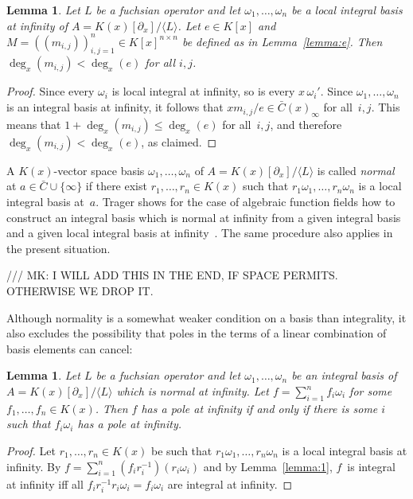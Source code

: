 \documentclass{sig-alternate}
\newtheorem{lemma}[theorem]{Lemma}
\def\<#1>{\langle#1\rangle}
\begin{document}
\begin{lemma} \label{lemma:degM}
  Let $L$ be a fuchsian operator and let $\omega_1,\dots,\omega_n$ be a local integral
  basis at infinity of $A=K(x)[\partial_x]/\<L>$. Let $e\in K[x]$ and $M=((m_{i,j}))_{i,j=1}^n\in K[x]^{n\times n}$
  be defined as in Lemma~\ref{lemma:e}. Then $\deg_x(m_{i,j})<\deg_x(e)$ for all $i,j$.
\end{lemma}
\begin{proof}
  Since every $\omega_i$ is local integral at infinity, so is every $x\,\omega_i'$.
  Since $\omega_1,\dots,\omega_n$ is an integral basis at infinity, it follows that
  $xm_{i,j}/e\in\bar C(x)_\infty$ for all~$i,j$. This means that $1+\deg_x(m_{i,j})\leq\deg_x(e)$
  for all~$i,j$, and therefore $\deg_x(m_{i,j})<\deg_x(e)$, as claimed.
\end{proof}

A $K(x)$-vector space basis $\omega_1,\dots,\omega_n$ of $A=K(x)[\partial_x]/\<L>$ is
called \emph{normal} at $a\in\bar C\cup\{\infty\}$ if there exist $r_1,\dots,r_n\in
K(x)$ such that $r_1\omega_1,\dots,r_n\omega_n$ is a local integral basis
at~$a$. Trager shows for the case of algebraic function fields how to construct
an integral basis which is normal at infinity from a given integral basis and
a given local integral basis at infinity~\cite{trager84}. The same procedure also applies
in the present situation. %

/// MK: I WILL ADD THIS IN THE END, IF SPACE PERMITS. OTHERWISE WE DROP IT.

Although normality is a somewhat weaker condition on a basis than integrality,
it also excludes the possibility that poles in the terms of a linear combination
of basis elements can cancel:

\begin{lemma}\label{lemma:3}
  Let $L$ be a fuchsian operator and let $\omega_1,\dots,\omega_n$ be an integral basis of $A=K(x)[\partial_x]/\<L>$
  which is normal at infinity.
  Let $f=\sum_{i=1}^n f_i\omega_i$ for some $f_1,\dots,f_n\in K(x)$.
  Then $f$ has a pole at infinity if and only if
  there is some $i$ such that $f_i\omega_i$ has a pole at infinity.
\end{lemma}
\begin{proof}
  Let $r_1,\dots,r_n\in K(x)$ be such that $r_1\omega_1,\dots,r_n\omega_n$ is a
  local integral basis at infinity. By $f=\sum_{i=1}^n
  (f_ir_i^{-1})(r_i\omega_i)$ and by Lemma~\ref{lemma:1}, $f$~is integral at infinity iff all
  $f_ir_i^{-1}r_i\omega_i=f_i\omega_i$ are integral at infinity.
\end{proof}
\end{document}
